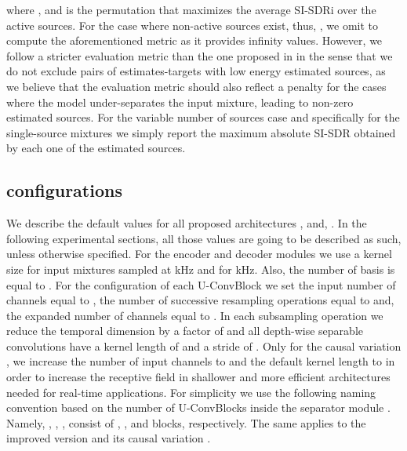 where ,  and  is the permutation that maximizes the average SI-SDRi over the active sources. For the case where non-active sources exist, thus, , we omit to compute the aforementioned metric as it provides infinity values. However, we follow a stricter evaluation metric than the one proposed in \cite{wisdom2020FUSS} in the sense that we do not exclude pairs of estimates-targets with low energy estimated sources, as we believe that the evaluation metric should also reflect a penalty for the cases where the model under-separates the input mixture, leading to  non-zero estimated sources. For the variable number of sources case and specifically for the single-source mixtures we simply report the maximum absolute SI-SDR obtained by each one of the estimated sources.


\subsection{\sudo configurations}
\label{sec:exp_setup:our_model_config}
We describe the default values for all proposed architectures \sudodot, \sudodoti and, \csudodoti. In the following experimental sections, all those values are going to be described as such, unless otherwise specified. For the encoder  and decoder modules  we use a kernel size  for input mixtures sampled at kHz and  for kHz. Also, the number of basis is equal to . For the configuration of each U-ConvBlock we set the input number of channels equal to , the number of successive resampling operations equal to  and, the expanded number of channels equal to . In each subsampling operation we reduce the temporal dimension by a factor of  and all depth-wise separable convolutions have a kernel length of  and a stride of . Only for the causal variation \csudodoti, we increase the number of input channels to  and the default kernel length to  in order to increase the receptive field in shallower and more efficient architectures needed for real-time applications. For simplicity we use the following naming convention based on the number  of U-ConvBlocks inside the separator module . Namely, \sudoxl, \sudol, \sudom, \sudos consist of , ,  and  blocks, respectively. The same applies to the improved version \sudoi and its causal variation \csudodoti.  

